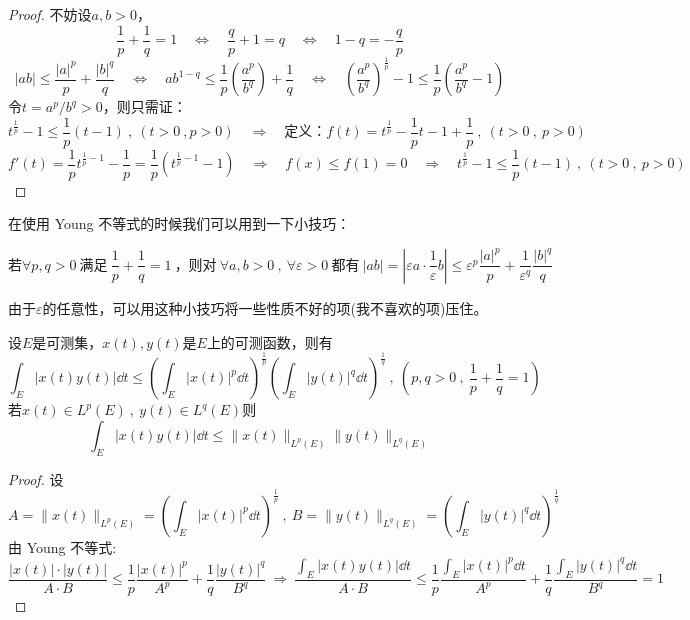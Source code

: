\begin{proof}
不妨设$a,b>0$，
\[\frac{1}{p}+\frac{1}{q}=1 \quad \Leftrightarrow \quad \frac{q}{p}+1=q \quad \Leftrightarrow \quad 1-q=-\frac{q}{p}\]
\[|ab| \leq \frac{|a|^p}{p}+\frac{|b|^q}{q} \quad \Leftrightarrow \quad ab^{1-q} \leq \frac{1}{p}\left(\frac{a^p}{b^q}\right)+\frac{1}{q} \quad \Leftrightarrow \quad \left(\frac{a^p}{b^q}\right)^{\frac{1}{p}}-1 \leq \frac{1}{p}\left(\frac{a^p}{b^q}-1\right)\]
令$t=a^p/b^q>0$，则只需证：
\[t^{\frac{1}{p}}-1 \leq \frac{1}{p}(t-1) \ , \ (t>0 \ ,p>0) \quad \Rightarrow \quad \text{定义：} f(t)=t^{\frac{1}{p}}-\frac{1}{p}t-1+\frac{1}{p} \ , \ (t>0 \ , \ p>0)\]
\[f'(t)=\frac{1}{p}t^{\frac{1}{p}-1}-\frac{1}{p}=\frac{1}{p}\left(t^{\frac{1}{p}-1}-1\right) \quad \Rightarrow \quad f(x) \leq f(1)=0 \quad \Rightarrow \quad t^{\frac{1}{p}}-1 \leq \frac{1}{p}(t-1) \ , \ (t>0 \ , \ p>0)\]
\end{proof}
在使用 Young 不等式的时候我们可以用到一下小技巧：
\begin{lemma}
\[\text{若} \forall p,q>0 \ \text{满足} \ \frac{1}{p}+\frac{1}{q}=1 \ \text{，则对} \ \forall a,b>0 \ , \ \forall \varepsilon>0 \ \text{都有} \ |ab|=|\varepsilon a \cdot \frac{1}{\varepsilon}b| \leq \varepsilon^p\frac{|a|^p}{p}+\frac{1}{\varepsilon^q}\frac{|b|^q}{q}\]
\end{lemma}
由于$\varepsilon$的任意性，可以用这种小技巧将一些性质不好的项(我不喜欢的项)压住。
\begin{theorem}
    设$E$是可测集，$x(t),y(t)$是$E$上的可测函数，则有
    \[\int_E|x(t)y(t)|\dd t \leq \left(\int_E|x(t)|^p\dd t\right)^{\frac{1}{p}}\left(\int_E|y(t)|^q\dd t\right)^{\frac{1}{q}} \ , \ (p,q>0 \ , \ \frac{1}{p}+\frac{1}{q}=1)\]
    若$x(t) \in L^p(E) \ , \ y(t) \in L^q(E)$则
    \[\int_E|x(t)y(t)|\dd t \leq \|x(t)\|_{L^p(E)}\|y(t)\|_{L^q(E)}\]
\end{theorem}
\begin{proof}
设
\[A=\|x(t)\|_{L^p(E)}=\left(\int_E|x(t)|^p\dd t\right)^{\frac{1}{p}} \ , \ B=\|y(t)\|_{L^q(E)}=\left(\int_E|y(t)|^q\dd t\right)^{\frac{1}{q}}\]
由 Young 不等式:
\[\frac{|x(t)| \cdot |y(t)|}{A \cdot B} \leq \frac{1}{p}\frac{|x(t)|^p}{A^p}+\frac{1}{q}\frac{|y(t)|^q}{B^q} \ \Rightarrow \ \frac{\int_E|x(t)y(t)|\dd t}{A \cdot B} \leq \frac{1}{p}\frac{\int_E|x(t)|^p\dd t}{A^p}+\frac{1}{q}\frac{\int_E|y(t)|^q\dd t}{B^q}=1\]
\end{proof}

